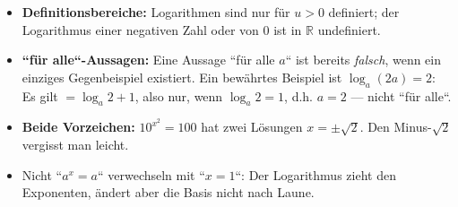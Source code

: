 \begin{achtung}
\begin{itemize}
  \item \textbf{Definitionsbereiche:} Logarithmen sind nur für $u>0$
        definiert; der Logarithmus einer negativen Zahl oder von $0$ ist
        in $\mathbb R$ undefiniert.
  \item \textbf{``für alle``-Aussagen:} Eine Aussage ``für alle $a$`` ist
        bereits \emph{falsch}, wenn ein einziges Gegenbeispiel existiert.
        Ein bewährtes Beispiel ist $\log_a(2a)=2$: Es gilt $=\log_a2+1$,
        also nur, wenn $\log_a2=1$, d.h. $a=2$ --- nicht ``für alle``.
  \item \textbf{Beide Vorzeichen:} $10^{x^2}=100$ hat zwei Lösungen
        $x=\pm\sqrt2$. Den Minus-$\sqrt2$ vergisst man leicht.
  \item Nicht ``$a^x=a$`` verwechseln mit ``$x=1$``: Der Logarithmus zieht
        den Exponenten, ändert aber die Basis nicht nach Laune.
\end{itemize}
\end{achtung}
